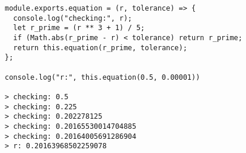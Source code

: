 \documentclass[boxes, qed]{homework}
\begin{document}
\begin{solution}
  \begin{lstlisting}[caption=Approximating the value of r to 4-digits]
module.exports.equation = (r, tolerance) => {
  console.log("checking:", r);
  let r_prime = (r ** 3 + 1) / 5;
  if (Math.abs(r_prime - r) < tolerance) return r_prime;
  return this.equation(r_prime, tolerance);
};

console.log("r:", this.equation(0.5, 0.00001))

> checking: 0.5
> checking: 0.225
> checking: 0.202278125
> checking: 0.20165530014704885
> checking: 0.20164005691286904
> r: 0.20163968502259078
\end{lstlisting}
\end{solution}
\end{document}
